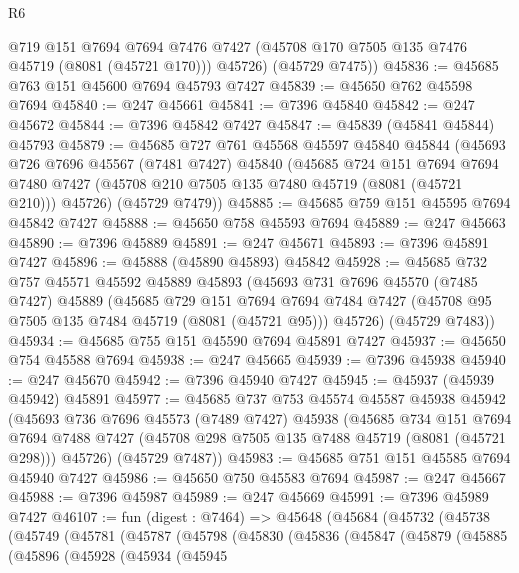\begin{lexlean}{R6}
\begin{coremodule}
        @719
        @151
        @7694
        @7694
        @7476
        @7427
        (@45708 @170 @7505 @135 @7476 @45719 (@8081 (@45721 @170)))
        @45726)
      (@45729 @7475))
@45836 := @45685 @763 @151 @45600 @7694 @45793 @7427
@45839 := @45650 @762 @45598 @7694
@45840 := @247 @45661
@45841 := @7396 @45840
@45842 := @247 @45672
@45844 := @7396 @45842 @7427
@45847 := @45839 (@45841 @45844) @45793
@45879 := @45685
    @727
    @761
    @45568
    @45597
    @45840
    @45844
    (@45693
      @726
      @7696
      @45567
      (@7481 @7427)
      @45840
      (@45685
        @724
        @151
        @7694
        @7694
        @7480
        @7427
        (@45708 @210 @7505 @135 @7480 @45719 (@8081 (@45721 @210)))
        @45726)
      (@45729 @7479))
@45885 := @45685 @759 @151 @45595 @7694 @45842 @7427
@45888 := @45650 @758 @45593 @7694
@45889 := @247 @45663
@45890 := @7396 @45889
@45891 := @247 @45671
@45893 := @7396 @45891 @7427
@45896 := @45888 (@45890 @45893) @45842
@45928 := @45685
    @732
    @757
    @45571
    @45592
    @45889
    @45893
    (@45693
      @731
      @7696
      @45570
      (@7485 @7427)
      @45889
      (@45685
        @729
        @151
        @7694
        @7694
        @7484
        @7427
        (@45708 @95 @7505 @135 @7484 @45719 (@8081 (@45721 @95)))
        @45726)
      (@45729 @7483))
@45934 := @45685 @755 @151 @45590 @7694 @45891 @7427
@45937 := @45650 @754 @45588 @7694
@45938 := @247 @45665
@45939 := @7396 @45938
@45940 := @247 @45670
@45942 := @7396 @45940 @7427
@45945 := @45937 (@45939 @45942) @45891
@45977 := @45685
    @737
    @753
    @45574
    @45587
    @45938
    @45942
    (@45693
      @736
      @7696
      @45573
      (@7489 @7427)
      @45938
      (@45685
        @734
        @151
        @7694
        @7694
        @7488
        @7427
        (@45708 @298 @7505 @135 @7488 @45719 (@8081 (@45721 @298)))
        @45726)
      (@45729 @7487))
@45983 := @45685 @751 @151 @45585 @7694 @45940 @7427
@45986 := @45650 @750 @45583 @7694
@45987 := @247 @45667
@45988 := @7396 @45987
@45989 := @247 @45669
@45991 := @7396 @45989 @7427
@46107 := fun (digest : @7464) =>
  @45648
    (@45684
      (@45732
        (@45738
          (@45749
            (@45781
              (@45787
                (@45798
                  (@45830
                    (@45836
                      (@45847
                        (@45879
                          (@45885
                            (@45896
                              (@45928
                                (@45934
                                  (@45945

\end{coremodule}
\end{lexlean}
